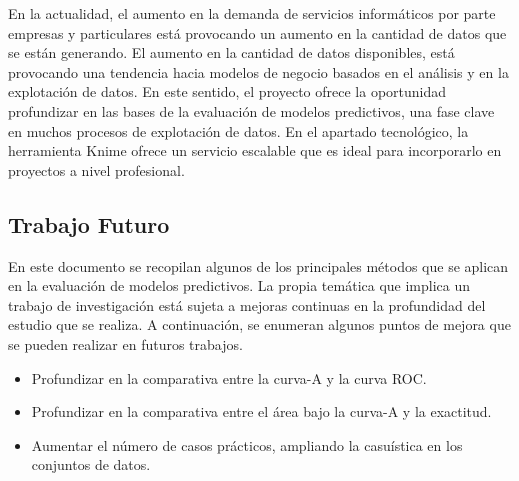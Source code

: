 \bigbreak

En la actualidad, el aumento en la demanda de servicios informáticos por parte empresas y particulares está provocando un aumento en la cantidad de datos que se están generando. El aumento en la cantidad de datos disponibles, está provocando una tendencia hacia modelos de negocio basados en el análisis y en la explotación de datos. En este sentido, el proyecto ofrece la oportunidad profundizar en las bases de la evaluación de modelos predictivos, una fase clave en muchos procesos de explotación de datos. En el apartado tecnológico, la herramienta Knime ofrece un servicio escalable que es ideal para incorporarlo en proyectos a nivel profesional.

\subsection{Trabajo Futuro}

En este documento se recopilan algunos de los principales métodos que se aplican en la evaluación de modelos predictivos. La propia temática que implica un trabajo de investigación está sujeta a mejoras continuas en la profundidad del estudio que se realiza. A continuación, se enumeran algunos puntos de mejora que se pueden realizar en futuros trabajos.

\begin{itemize}
    \item Profundizar en la comparativa entre la curva-A y la curva ROC.
    \item Profundizar en la comparativa entre el área bajo la curva-A y la exactitud.
    \item Aumentar el número de casos prácticos, ampliando la casuística en los conjuntos de datos.
\end{itemize}

\clearpage